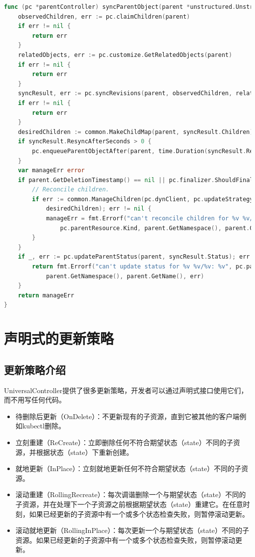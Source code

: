 \documentclass[macfonts,master]{njuthesis}
\begin{document}
\begin{lstlisting}[language=Go,caption=同步父资源,label=listing:syncparent]
func (pc *parentController) syncParentObject(parent *unstructured.Unstructured) error {
	observedChildren, err := pc.claimChildren(parent)
	if err != nil {
		return err
	}
	relatedObjects, err := pc.customize.GetRelatedObjects(parent)
	if err != nil {
		return err
	}
	syncResult, err := pc.syncRevisions(parent, observedChildren, relatedObjects)
	if err != nil {
		return err
	}
	desiredChildren := common.MakeChildMap(parent, syncResult.Children)
	if syncResult.ResyncAfterSeconds > 0 {
		pc.enqueueParentObjectAfter(parent, time.Duration(syncResult.ResyncAfterSeconds*float64(time.Second)))
	}
	var manageErr error
	if parent.GetDeletionTimestamp() == nil || pc.finalizer.ShouldFinalize(parent) {
		// Reconcile children.
		if err := common.ManageChildren(pc.dynClient, pc.updateStrategy, parent, observedChildren,
			desiredChildren); err != nil {
			manageErr = fmt.Errorf("can't reconcile children for %v %v/%v: %v",
				pc.parentResource.Kind, parent.GetNamespace(), parent.GetName(), err)
		}
	}
	if _, err := pc.updateParentStatus(parent, syncResult.Status); err != nil {
		return fmt.Errorf("can't update status for %v %v/%v: %v", pc.parentResource.Kind,
			parent.GetNamespace(), parent.GetName(), err)
	}
	return manageErr
}
\end{lstlisting}


\section{声明式的更新策略}
\subsection{更新策略介绍}
UniversalController提供了很多更新策略，开发者可以通过声明式接口使用它们，而不用写任何代码。
\begin{itemize}
	\item 待删除后更新（OnDelete）：不更新现有的子资源，直到它被其他的客户端例如kubectl删除。
	\item 立刻重建（ReCreate）：立即删除任何不符合期望状态（state）不同的子资源，并根据状态（state）下重新创建。
	\item 就地更新（InPlace）：立刻就地更新任何不符合期望状态（state）不同的子资源。
	\item 滚动重建（RollingRecreate）：每次调谐删除一个与期望状态（state）不同的子资源，并在处理下一个子资源之前根据期望状态（state）重建它。在任意时刻，如果已经更新的子资源中有一个或多个状态检查失败，则暂停滚动更新。
	\item 滚动就地更新（RollingInPlace）：每次更新一个与期望状态（state）不同的子资源。如果已经更新的子资源中有一个或多个状态检查失败，则暂停滚动更新。
\end{itemize}
\end{document}
